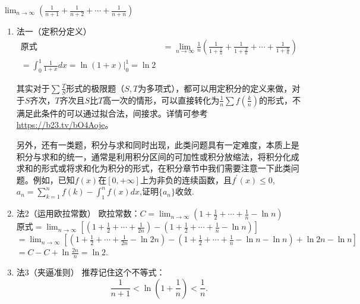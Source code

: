 \begin{example}
	$\lim_{n \to \infty}(\frac{1}{n+1}+\frac{1}{n+2}+\cdots +\frac{1}{n+n})$
\end{example}
\begin{solution}
	\begin{enumerate}
		\item 法一（定积分定义）
		      \begin{align*}
			      \text{原式} & =\lim_{n \to \infty}\frac{1}{n}(\frac{1}{1+\frac{1}{n}}+\frac{1}{1+\frac{2}{n}}+\cdots+\frac{1}{1+\frac{n}{n}}) \\=\int_{0}^{1}\frac{1}{1+x}dx=\ln (1+x)|_{0}^{1}=\ln 2
		      \end{align*}

		      其实对于$\sum\frac{T}{S}$形式的极限题（$S,T$为多项式），都可以用定积分的定义来做，对于$S$齐次，$T$齐次且$S$比$T$高一次的情形，可以直接转化为$\frac{1}{n}\sum f(\frac{k}{n})$的形式，不满足此条件的可以通过拟合法，间接求。详情可参考\url{https://b23.tv/bO4Aoje}。

		      另外，还有一类题，积分与求和同时出现，此类问题具有一定难度，本质上是积分与求和的统一，通常是利用积分区间的可加性或积分放缩法，将积分化成求和的形式或将求和化为积分的形式，在积分章节中我们需要注意一下此类问题。例如，已知$f(x)$在$[0,+\infty ]$上为非负的连续函数，且$f^{'}(x) \leq 0$,$a_n=\sum_{k=1}^{n}f(k)-\int_{1}^{n}f(x)dx$,证明$\{a_n\}$收敛.
		\item 法2（运用欧拉常数）
		      欧拉常数：$C=\lim_{n \to \infty}(1+\frac{1}{2}+\cdots+\frac{1}{n}-\ln n)$\\
		      原式$=\lim_{n \to \infty}[(1+\frac{1}{2}+\cdots+\frac{1}{2n})-(1+\frac{1}{2}+\cdots+\frac{1}{n}-\ln n)]$\\
		      $=\lim_{n \to \infty}[(1+\frac{1}{2}+\cdots+\frac{1}{2n}-\ln 2n)-(1+\frac{1}{2}+\cdots+\frac{1}{n}-\ln n-
				      \ln n)+\ln 2n -\ln n]$\\
		      $=C-C+\ln \frac{2n}{n}=\ln 2$.
		\item 法3（夹逼准则）
		      推荐记住这个不等式：$$\frac{1}{n+1}<\ln(1+\frac{1}{n})<\frac{1}{n}.$$


\end{enumerate}
\end{solution}
